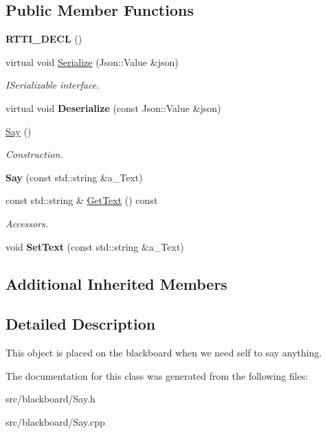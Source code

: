 \subsection*{Public Member Functions}
\begin{DoxyCompactItemize}
\item 
\mbox{\label{class_say_a95ff271ca43ebac094887830a441842b}} 
{\bfseries R\+T\+T\+I\+\_\+\+D\+E\+CL} ()
\item 
\mbox{\label{class_say_ae74161f8bd14fb45aa76c9a5b5741bfd}} 
virtual void \hyperlink{class_say_ae74161f8bd14fb45aa76c9a5b5741bfd}{Serialize} (Json\+::\+Value \&json)
\begin{DoxyCompactList}\small\item\em I\+Serializable interface. \end{DoxyCompactList}\item 
\mbox{\label{class_say_a514699e870abc523ab3a6275c051a266}} 
virtual void {\bfseries Deserialize} (const Json\+::\+Value \&json)
\item 
\mbox{\label{class_say_a41965c642cae90d518121d0b9c8175d1}} 
\hyperlink{class_say_a41965c642cae90d518121d0b9c8175d1}{Say} ()
\begin{DoxyCompactList}\small\item\em Construction. \end{DoxyCompactList}\item 
\mbox{\label{class_say_a76a72f55bdde108312ad5f80f919f7bc}} 
{\bfseries Say} (const std\+::string \&a\+\_\+\+Text)
\item 
\mbox{\label{class_say_ac9e53667fa5f1edc4bd17cef871136db}} 
const std\+::string \& \hyperlink{class_say_ac9e53667fa5f1edc4bd17cef871136db}{Get\+Text} () const
\begin{DoxyCompactList}\small\item\em Accessors. \end{DoxyCompactList}\item 
\mbox{\label{class_say_ae829cb305d572b977a255aa00b2c2f01}} 
void {\bfseries Set\+Text} (const std\+::string \&a\+\_\+\+Text)
\end{DoxyCompactItemize}
\subsection*{Additional Inherited Members}


\subsection{Detailed Description}
This object is placed on the blackboard when we need self to say anything. 

The documentation for this class was generated from the following files\+:\begin{DoxyCompactItemize}
\item 
src/blackboard/Say.\+h\item 
src/blackboard/Say.\+cpp\end{DoxyCompactItemize}
